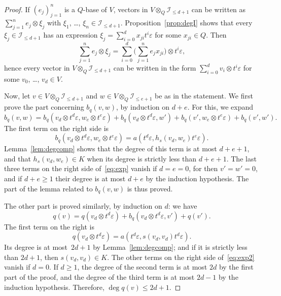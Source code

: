 \documentclass{amsart}
\newcommand{\calI}{\mathcal{I}}
\theoremstyle{remark}
\begin{document}
\begin{proof}
  If $(e_j)_{j=1}^n$ is a $Q$-base of $V$, vectors in 
  $V\otimes_Q\calI_{\leq d+1}$ can be written as $\sum_{j=1}^n
  e_j\otimes\xi_j$ with $\xi_1$, \ldots, $\xi_n\in\calI_{\leq d+1}$.
  Proposition~\ref{prop:degI} shows that every $\xi_j\in\calI_{\leq
    d+1}$ has an expression $\xi_j=\sum_{i=0}^{d}
  x_{ji}t^i\varepsilon$ for some $x_{ji}\in Q$. Then
  \[
    \sum_{j=1}^n e_j\otimes\xi_j = \sum_{i=0}^{d} \bigl(\sum_{j=1}^n
    e_jx_{ji}\bigr) \otimes t^i\varepsilon,
  \]
  hence every vector in $V\otimes_Q\calI_{\leq d+1}$ can be
  written in the form
  $
  \sum_{i=0}^{d}v_i\otimes t^i\varepsilon
  $
  for some $v_0$, \ldots, $v_{d}\in V$.

  Now, let $v\in V\otimes_Q\calI_{\leq d+1}$ and $w\in
  V\otimes_Q\calI_{\leq e+1}$ be as in the statement.
  We first prove the part concerning $b_q(v,w)$, by induction on
  $d+e$. For this, we expand
  \begin{equation}
    \label{eq:exp}
    b_q(v,w) = b_q(v_{d}\otimes t^{d}\varepsilon,
    w_{e}\otimes t^{e}\varepsilon) + b_q(v_{d}\otimes
    t^{d}\varepsilon, w') + b_q(v',w_{e}\otimes
    t^{e}\varepsilon) +b_q(v',w').
  \end{equation}
  The first term on the right side is
  \[
    b_q(v_{d}\otimes t^{d}\varepsilon,
    w_{e}\otimes t^{e}\varepsilon) = a(t^{d}\varepsilon,
    h_s(v_{d},w_{e})t^{e}\varepsilon). 
  \]
  Lemma~\ref{lem:degcomp} shows that
  the degree of this term is at most $d+e+1$, and that $h_s(v_{d},
  w_{e})\in K$ 
  when its degree is strictly less than $d+e+1$. The last three terms
  on the right side 
  of~\eqref{eq:exp} vanish if $d=e=0$, for then $v'=w'=0$, and if
  $d+e\geq1$ their degree 
  is at most $d+e$ by the induction hypothesis. The part of the
  lemma related to $b_q(v,w)$ is thus proved.

  The other part is proved similarly, by induction on $d$: we have
  \begin{equation}
    \label{eq:exp2}
    q(v) = q(v_{d}\otimes t^{d}\varepsilon) +
    b_q(v_{d}\otimes t^{d}\varepsilon,v') + q(v').
  \end{equation}
  The first term on the right is
  \[
    q(v_{d}\otimes t^{d}\varepsilon) = a(t^{d}\varepsilon,
    s(v_{d},v_{d})t^{d}\varepsilon). 
  \]
  Its degree is at most~$2d+1$ by
  Lemma~\ref{lem:degcomp}; and if it is strictly less than
  $2d+1$, then $s(v_{d},v_{d})\in K$. The other terms on the right
  side of~\eqref{eq:exp2} vanish if 
  $d=0$. If $d\geq1$, the degree of the second term is at most $2d$
  by the first part of the proof, and the degree of the third term is
  at most $2d-1$ by the induction hypothesis. Therefore,
  $\deg q(v) \leq 2d+1$.
\end{proof}
\end{document}
